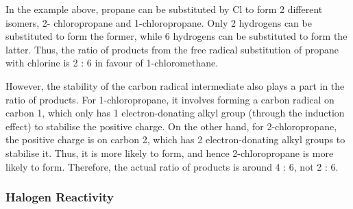 


				In the example above, propane can be substituted by Cl to form 2 different isomers, 2- chloropropane and 1-chloropropane.
				Only 2 hydrogens can be substituted to form the former, while 6 hydrogens can be substituted to form the latter. Thus, the
				 ratio of products from the free radical substitution of propane with chlorine is 2 : 6 in
				favour of 1-chloromethane.

				However, the stability of the carbon radical intermediate also plays a part in the ratio of products. For 1-chloropropane,
				it involves forming a carbon radical on carbon 1, which only has 1 electron-donating alkyl group (through the induction effect)
				to stabilise the positive charge. On the other hand, for 2-chloropropane, the positive charge is on carbon 2, which
				has 2 electron-donating alkyl groups to stabilise it. Thus, it is more likely to form, and hence 2-chloropropane is more
				likely to form.	Therefore, the actual ratio of products is around 4 : 6, not 2 : 6.



			\subsubsection{Halogen Reactivity}

